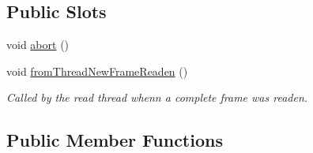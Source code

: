 \subsection*{Public Slots}
\begin{DoxyCompactItemize}
\item 
void \hyperlink{classmdt_usbtmc_port_manager_a532f927dc92b167018c2e9051b0940ad}{abort} ()
\item 
void \hyperlink{classmdt_usbtmc_port_manager_aca42b343ae1f6a324e6e45968f03bbea}{fromThreadNewFrameReaden} ()
\begin{DoxyCompactList}\small\item\em Called by the read thread whenn a complete frame was readen. \end{DoxyCompactList}\end{DoxyCompactItemize}
\subsection*{Public Member Functions}
